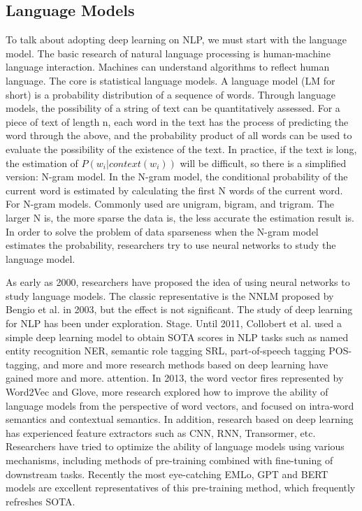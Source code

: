 \subsection{Language Models}
To talk about adopting deep learning on NLP, we must start with the language model. The basic research of natural language processing is human-machine language interaction. Machines can understand algorithms to reflect human language. The core is statistical language models. A language model (LM for short) is a probability distribution of a sequence of words. Through language models, the possibility of a string of text can be quantitatively assessed. For a piece of text of length n, each word in the text has the process of predicting the word through the above, and the probability product of all words can be used to evaluate the possibility of the existence of the text. In practice, if the text is long, the estimation of $P (w_i | context (w_i))$ will be difficult, so there is a simplified version: N-gram model. In the N-gram model, the conditional probability of the current word is estimated by calculating the first N words of the current word. For N-gram models. Commonly used are unigram, bigram, and trigram. The larger N is, the more sparse the data is, the less accurate the estimation result is. In order to solve the problem of data sparseness when the N-gram model estimates the probability, researchers try to use neural networks to study the language model.

As early as 2000, researchers have proposed the idea of using neural networks to study language models. The classic representative is the NNLM proposed by Bengio et al. \cite{nnlm} in 2003, but the effect is not significant. The study of deep learning for NLP has been under exploration. Stage. Until 2011, Collobert et al. \cite{nlpscratch} used a simple deep learning model to obtain SOTA scores in NLP tasks such as named entity recognition NER, semantic role tagging SRL, part-of-speech tagging POS-tagging, and more and more research methods based on deep learning have gained more and more. attention. In 2013, the word vector fires represented by Word2Vec and Glove, more research explored how to improve the ability of language models from the perspective of word vectors, and focused on intra-word semantics and contextual semantics. In addition, research based on deep learning has experienced feature extractors such as CNN, RNN, Transormer, etc. Researchers have tried to optimize the ability of language models using various mechanisms, including methods of pre-training combined with fine-tuning of downstream tasks. Recently the most eye-catching EMLo, GPT and BERT models are excellent representatives of this pre-training method, which frequently refreshes SOTA.

